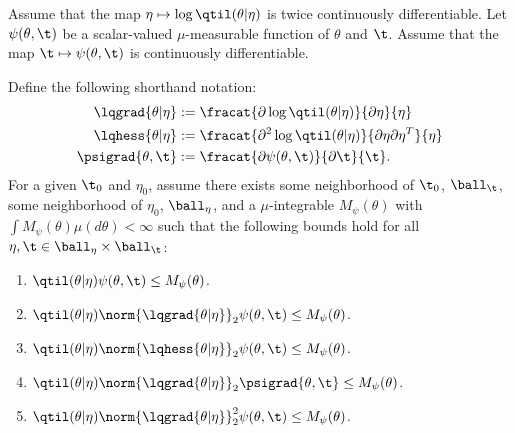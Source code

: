\hrulefill


\begin{assu}
%
%
Assume that the map $\eta \mapsto \log \qtil(\theta \vert \eta)$ is twice
continuously differentiable. Let $\psi(\theta, \t)$ be a scalar-valued
$\mu$-measurable function of $\theta$ and $\t$.  Assume that the map $\t \mapsto
\psi(\theta, \t)$ is continuously differentiable.

Define the following shorthand notation:
%
\begin{align*}
%
\lqgrad{\theta \vert \eta} :={}&
    \fracat{\partial \log \qtil(\theta \vert \eta)}{\partial \eta}{\eta} \\
%
\lqhess{\theta \vert \eta} :={}&
    \fracat{\partial^2 \log \qtil(\theta \vert \eta)}
           {\partial \eta \partial \eta^T}{\eta} \\
%
\psigrad{\theta, \t} :={}& \fracat{\partial \psi(\theta, \t)}{\partial \t}{\t}.
%
\end{align*}
%
For a given $\t_0$ and $\eta_0$, assume there exists some neighborhood of
$\t_0$, $\ball_\t$, some neighborhood of $\eta_0$, $\ball_\eta$, and a
$\mu$-integrable $M_\psi(\theta)$ with $\int M_\psi(\theta) \mu(d\theta) <
\infty$ such that the following bounds hold for all $\eta, \t \in \ball_\eta
\times \ball_\t$:
%
\begin{enumerate}
%
\item {}
$\qtil(\theta \vert \eta) \psi(\theta, \t) \le M_\psi(\theta)$.
%
\item {}
$\qtil(\theta \vert \eta) \norm{\lqgrad{\theta \vert \eta}}_2 \psi(\theta, \t) \le
M_\psi(\theta)$.
%
\item {}
$\qtil(\theta \vert \eta) \norm{\lqhess{\theta \vert \eta}}_2 \psi(\theta, \t) \le
M_\psi(\theta)$.
%
\item {}
$\qtil(\theta \vert \eta) \norm{\lqgrad{\theta \vert \eta}}_2 \psigrad{\theta, \t}
\le M_\psi(\theta)$.
%
\item {}
$\qtil(\theta \vert \eta) \norm{\lqgrad{\theta \vert \eta}}^2_2 \psi(\theta, \t) \le
M_\psi(\theta)$.
%
\end{enumerate}
%
\end{assu}





